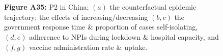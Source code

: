 \documentclass[paper=a4,fontsize=11pt]{article}
\begin{document}
\begin{figure}[!h]
  \\
  \hspace{1.76cm}
  \\
  \caption*{\textbf{Figure A35:} P2 in China; $(a)$ the counterfactual epidemic trajectory; the effects of increasing/decreasing $(b,c)$ the government response time \& proportion of cases self-isolating, $(d,e)$ adherence to NPIs during lockdown \& hospital capacity, and $(f,g)$ vaccine administration rate \& uptake.}
\end{figure}
\end{document}
